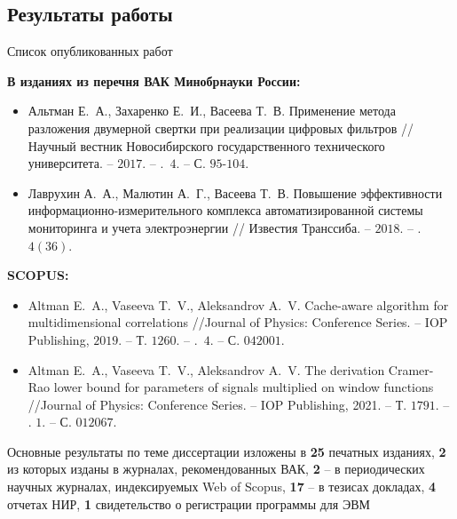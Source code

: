 \subsection{Результаты работы}
\begin{frame}{Список опубликованных работ}
\scriptsize{
\textbf{В изданиях из перечня ВАК Минобрнауки России:}	
\begin{itemize}
	\item Альтман Е.~А., Захаренко Е.~И., Васеева Т.~В. Применение метода разложения двумерной свертки при реализации цифровых фильтров // Научный вестник Новосибирского государственного технического университета. – $2017$. – \textnumero.~$4$. – С. $95$-$104$.
	
	\item Лаврухин А.~А., Малютин А.~Г., Васеева Т.~В. Повышение эффективности информационно-измерительного комплекса автоматизированной системы мониторинга и учета электроэнергии // Известия Транссиба. – $2018$. – \textnumero.~$4 (36)$.
\end{itemize}}	
\scriptsize{
\textbf{SCOPUS:}	
\begin{itemize}
	\item Altman E.~A., Vaseeva T.~V., Aleksandrov A.~V. Cache-aware algorithm for multidimensional correlations //Journal of Physics: Conference Series. – IOP Publishing, $2019$. – Т. $1260$. – \textnumero.~$4$. – С. $042001$.
	
	\item Altman E.~A., Vaseeva T.~V., Aleksandrov A.~V. The derivation Cramer-Rao lower bound for parameters of signals multiplied on window functions //Journal of Physics: Conference Series. – IOP Publishing, 2021. – Т. $1791$. – \textnumero. $1$. – С. $012067$.
\end{itemize}}

\normalsize{Основные результаты по теме диссертации изложены в \textbf{25} печатных изданиях, \textbf{2} из которых изданы в журналах, рекомендованных ВАК, \textbf{2} -- в периодических научных журналах, индексируемых Web of Scopus, \textbf{17} -- в тезисах докладах, \textbf{4} отчетах НИР, \textbf{1} свидетельство о регистрации программы для ЭВМ}


%	
%		
\end{frame}	

